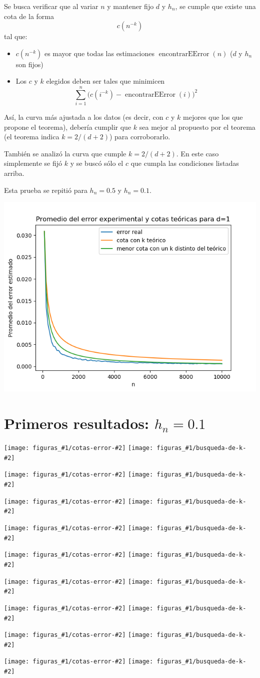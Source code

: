 \documentclass[12pt, a4paper]{article}
\newcommand{\imagenesDH}[2]{
  \texttt{[image: figuras\_\#1/cotas-error-\#2]}
  \texttt{[image: figuras\_\#1/busqueda-de-k-\#2]}
}
\begin{document}
Se busca verificar que al variar $n$ y mantener fijo $d$ y $h_n$, se cumple que existe una cota de la forma $$c(n^{-k})$$ tal que:
\begin{itemize}
  \item $c(n^{-k})$ es mayor que todas las estimaciones $\mathop{encontrarEError}(n)$ ($d$ y $h_n$ son fijos)
  \item Los $c$ y $k$ elegidos deben ser tales que minimicen $$\sum_{i=1}^n \big( c(i^{-k}) - \mathop{encontrarEError}(i) \big)^2$$
\end{itemize}
Así, la curva más ajustada a los datos (es decir, con $c$ y $k$ mejores que los que propone el teorema), debería cumplir que $k$ sea mejor al propuesto por el teorema (el teorema indica $k=2/(d+2)$) para corroborarlo.

También se analizó la curva que cumple $k=2/(d+2)$. En este caso simplemente se fijó $k$ y se buscó sólo el $c$ que cumpla las condiciones listadas arriba.

Esta prueba se repitió para $h_n=0.5$ y $h_n=0.1$.

\includegraphics[width=\textwidth]{figuras_h=0.1/cotas-error-d=1}

\section{Primeros resultados: $h_n=0.1$}

\imagenesDH{h=0.1}{d=1}
\imagenesDH{h=0.1}{d=2}
\imagenesDH{h=0.1}{d=3}
\imagenesDH{h=0.1}{d=4}
\imagenesDH{h=0.1}{d=6}
\imagenesDH{h=0.1}{d=8}
\imagenesDH{h=0.1}{d=10}
\imagenesDH{h=0.1}{d=30}
\imagenesDH{h=0.1}{d=100}
\end{document}
